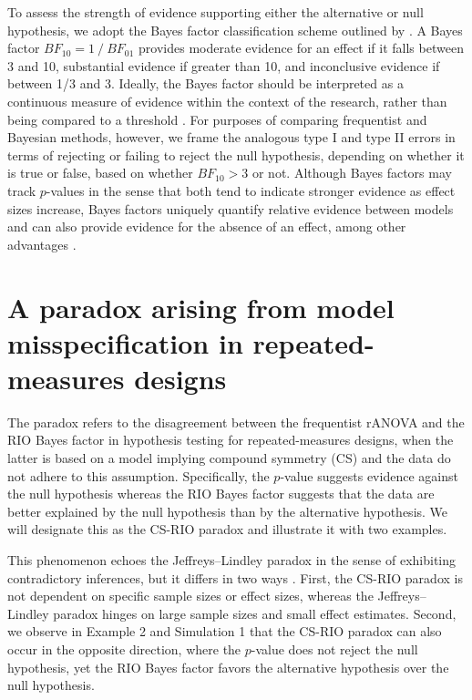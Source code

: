 \documentclass[preprint,12pt,authoryear]{elsarticle}
\begin{document}
To assess the strength of evidence supporting either the alternative or null hypothesis, we adopt the Bayes factor classification scheme outlined by \citet{held_p-values_2018}. A Bayes factor $\mathit{BF}_{10}=1\ \!/\ \!\mathit{BF}_{01}$ provides moderate evidence for an effect if it falls between 3 and 10, substantial evidence if greater than 10, and inconclusive evidence if between 1/3 and 3. Ideally, the Bayes factor should be interpreted as a continuous measure of evidence within the context of the research, rather than being compared to a threshold \citep[p.~318]{rouder_bayesian_2017}. For purposes of comparing frequentist and Bayesian methods, however, we frame the analogous type I and type II errors in terms of rejecting or failing to reject the null hypothesis, depending on whether it is true or false, based on whether $\mathit{BF}_{10}>3$ or not. Although Bayes factors may track $p$-values in the sense that both tend to indicate stronger evidence as effect sizes increase, Bayes factors uniquely quantify relative evidence between models and can also provide evidence for the absence of an effect, among other advantages \citep{wei_investigating_2023}.


\section{A paradox arising from model misspecification in repeated-measures designs}
\label{sec3}

The paradox refers to the disagreement between the frequentist rANOVA and the RIO Bayes factor in hypothesis testing for repeated-measures designs, when the latter is based on a model implying compound symmetry (CS) and the data do not adhere to this assumption. Specifically, the $p$-value suggests evidence against the null hypothesis whereas the RIO Bayes factor suggests that the data are better explained by the null hypothesis than by the alternative hypothesis. We will designate this as the CS-RIO paradox and illustrate it with two examples.

This phenomenon echoes the Jeffreys–Lindley paradox in the sense of exhibiting contradictory inferences, but it differs in two ways \citep{bartlett_comment_1957,jeffreys_tests_1935,lindley_statistical_1957,wagenmakers_history_2023}. First, the CS-RIO paradox is not dependent on specific sample sizes or effect sizes, whereas the Jeffreys–Lindley paradox hinges on large sample sizes and small effect estimates. Second, we observe in Example 2 and Simulation 1 that the CS-RIO paradox can also occur in the opposite direction, where the $p$-value does not reject the null hypothesis, yet the RIO Bayes factor favors the alternative hypothesis over the null hypothesis.
\end{document}
